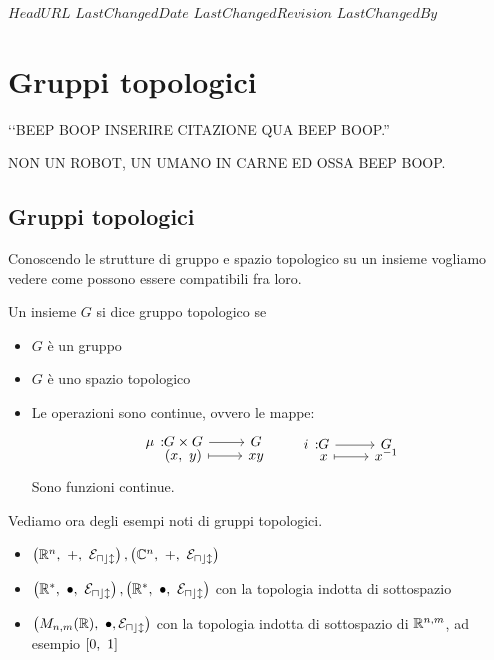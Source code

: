 \svnidlong
{$HeadURL$}
{$LastChangedDate$}
{$LastChangedRevision$}
{$LastChangedBy$}

\chapter{Gruppi topologici}

\begin{introduction}
‘‘BEEP BOOP INSERIRE CITAZIONE QUA BEEP BOOP.''
\begin{flushright}
	\textsc{NON UN ROBOT,} UN UMANO IN CARNE ED OSSA BEEP BOOP.
\end{flushright}
\end{introduction}

\section{Gruppi topologici}
Conoscendo le strutture di gruppo e spazio topologico su un insieme vogliamo vedere come possono essere compatibili fra loro.
\begin{define}
	Un insieme $G$ si dice gruppo topologico se
		\begin{itemize}
			\item $G$ è un gruppo
			\item $G$ è uno spazio topologico
			\item Le operazioni sono continue, ovvero le mappe:
			\begin{equation}
				\funztot \mu {G\times G} G {(x,\ y)} {xy}\qquad \funztot i G G x {x^{-1}}
			\end{equation}
		Sono funzioni continue.
		\end{itemize}
\end{define}
Vediamo ora degli esempi noti di gruppi topologici.
\begin{examples}
	\begin{itemize}
		\item $\left( \realset^n, \ +, \ \mathcal{E_{ucl}} \right), \left( \complexset ^n, \ +, \ \mathcal{E_{ucl}} \right)$
		\item $\left( \realset^*, \ \bullet,\ \mathcal{E_{ucl}} \right), \left( \realset^*, \ \bullet, \ \mathcal{E_{ucl}} \right)$ con la topologia indotta di sottospazio
		\item $\left( M_{n,m}(\mathbb{R}),\ \bullet, \mathcal{E_{ucl}} \right)$ con la topologia indotta di sottospazio di $\mathbb{R}^{n,m}$, ad esempio $\left[0,\ 1\right]$
	\end{itemize}	
\end{examples}
